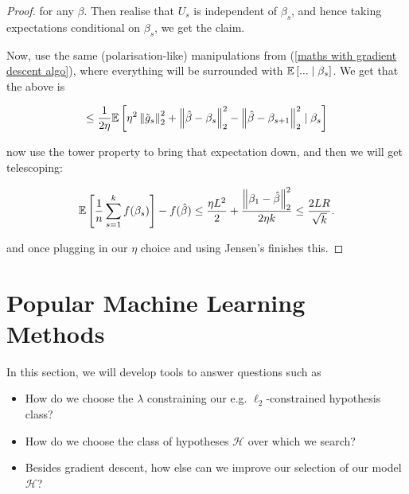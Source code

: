 \documentclass[11pt]{scrartcl}
\begin{document}
\begin{theorem}
\begin{proof}
for any $\beta$. Then realise that $U_s$ is independent of $\beta_s$, and hence taking expectations conditional on $\beta_s$, we get the claim.


Now, use the same (polarisation-like) manipulations from (\ref{maths with gradient descent algo}), where everything will be surrounded with $\mathbb{E} \left[ ... \mid \beta_s \right]$. We get that the above is

\begin{align}
    \le \frac{1}{2\eta} \mathbb{E} \left[  \eta^2 \left\lVert\tilde{g}_s\right\rVert_2^2 + \left\lVert\hat{\beta} - \beta_s\right\rVert_2^2 - \left\lVert\hat{\beta} - \beta_{s+1}\right\rVert_2^2 \mid \beta_s \right]
\end{align}

now use the tower property to bring that expectation down, and then we will get telescoping:

\begin{equation}
    \mathbb{E} \left[ \frac1n \sum_{s=1}^k f(\beta_s) \right] - f(\hat{\beta}) \le \frac{\eta L^2}{2} + \frac{\left\lVert\beta_1 - \hat{\beta}\right\rVert_2^2}{2 \eta k} \le \frac{2LR}{\sqrt{k}}.
\end{equation}

and once plugging in our $\eta$ choice and using Jensen's finishes this.


\end{proof}
\end{theorem}

\section{Popular Machine Learning Methods}

In this section, we will develop tools to answer questions such as

\begin{itemize}
\item How do we choose the $\lambda$ constraining our e.g. $\ell_2$-constrained hypothesis class? 
\item How do we choose the class of hypotheses $\mathcal{H}$ over which we search?
\item Besides gradient descent, how else can we improve our selection of our model $\mathcal{H}$?
\end{itemize}
\end{document}
